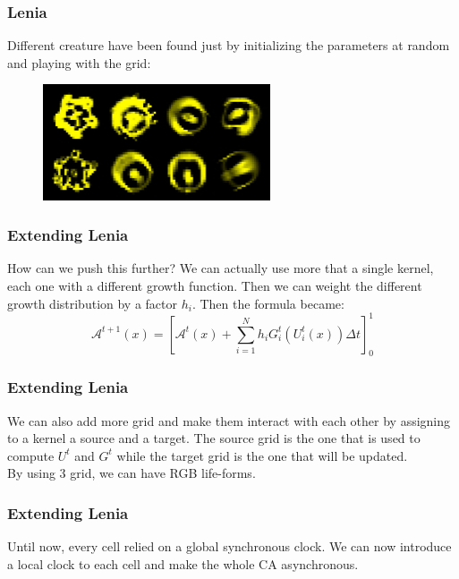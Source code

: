 \documentclass{beamer}
\begin{document}
\begin{frame}
  \frametitle{Lenia}
  Different creature have been found just by initializing the parameters at random and playing with the grid:
  \begin{figure}
    \begin{center}
      \includegraphics[width=0.6\textwidth]{./creatures.jpg}
    \end{center}
  \end{figure}
\end{frame}

\begin{frame}
  \frametitle{Extending Lenia}
  How can we push this further? We can actually use more that a single kernel,
  each one with a different growth function. Then we can weight the different
  growth distribution by a factor $h_i$. Then the formula became:
  \begin{equation}
    \mathcal{A}^{t+1}(x) = [\mathcal{A}^t(x) + \sum_{i=1}^N h_i G^t_i(U^t_i(x))\Delta t]^1_0
  \end{equation}
\end{frame}

\begin{frame}
  \frametitle{Extending Lenia}
  We can also add more grid and make them interact with each other by assigning
  to a kernel a source and a target. The source grid is the one that is used to
  compute $U^t$ and $G^t$ while the target grid is the one that will be updated.\\
  By using 3 grid, we can have RGB life-forms.
\end{frame}

\begin{frame}
  \frametitle{Extending Lenia}
  Until now, every cell relied on a global synchronous clock. We can now
  introduce a local clock to each cell and make the whole CA asynchronous.
\end{frame}
\end{document}
